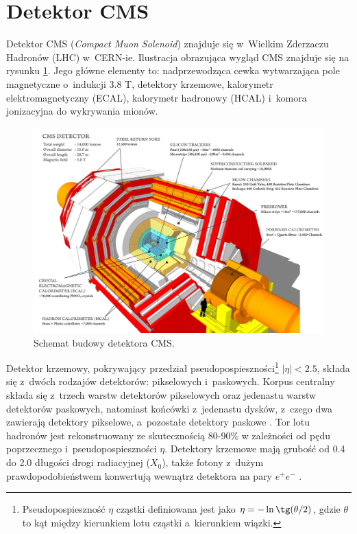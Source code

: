 \documentclass{pracalicmgr}
\begin{document}
    \section{Detektor CMS}
	Detektor CMS (\textit{Compact Muon Solenoid}) znajduje się w~Wielkim Zderzaczu Hadronów (LHC) \cite{adolphi2008cms} w~CERN-ie. Ilustracja obrazująca wygląd CMS znajduje się na rysunku \ref{fig:cms}. Jego główne elementy to: nadprzewodząca cewka wytwarzająca pole magnetyczne o~indukcji 3.8 T, detektory krzemowe, kalorymetr elektromagnetyczny (ECAL), kalorymetr hadronowy (HCAL) i~komora jonizacyjna do wykrywania mionów. 
	
	\begin{figure}[H]
	\centering
	\includegraphics[width=1\textwidth]{cms.png}
	\caption{Schemat budowy detektora CMS.}
	\label{fig:cms}
	\end{figure}
	
	Detektor krzemowy, pokrywający przedział pseudopospieszności\footnote{Pseudopospieszność $\eta$ cząstki definiowana jest jako $\eta = -\ln \tg(\theta/2)$, gdzie $\theta$ to kąt między kierunkiem lotu cząstki a~kierunkiem wiązki.} $|\eta| < 2.5$, składa się z~dwóch rodzajów detektorów: pikselowych i~paskowych. Korpus centralny składa się z~trzech warstw detektorów pikselowych oraz jedenastu warstw detektorów paskowych, natomiast końcówki z~jedenastu dysków, z~czego dwa zawierają detektory pikselowe, a~pozostałe detektory paskowe \cite{cms_technical}. Tor lotu hadronów jest rekonstruowany ze skutecznością 80-90\% w zależności od pędu poprzecznego i~pseudopospieszności $\eta$. Detektory krzemowe mają grubość od 0.4 do 2.0 długości drogi radiacyjnej ($X_0$), także fotony z~dużym prawdopodobieństwem konwertują wewnątrz detektora na pary $e^+e^-$ \cite{tauid13}.
	
\end{document}
